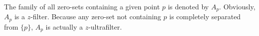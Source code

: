 The family of all zero-sets containing a given point $p$ is denoted by $A_p$. Obviously, $A_p$ is a $z$-filter. Because any zero-set not containing $p$ is completely separated from $\{p\}$, $A_p$ is actually a $z$-ultrafilter.
